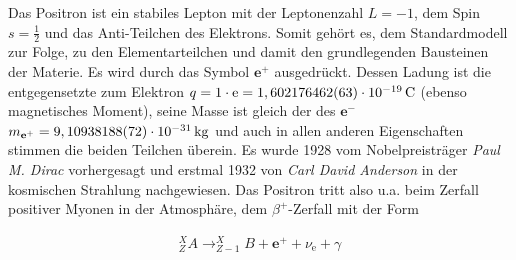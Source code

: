 \documentclass[numbers=noenddot,a4paper,notitlepage,twoside]{scrartcl}
\newcommand{\tenpo}[1]{ 10^{#1}}
\newcommand{\ix}[1]{_\text{#1}}
\newcommand{\tilt}[1]{\textit{#1}}
\begin{document}
			Das Positron ist ein stabiles Lepton mit der Leptonenzahl $L=-1$, dem Spin $s=\frac{1}{2}$ und das Anti-Teilchen des Elektrons. Somit gehört es, dem Standardmodell zur Folge, zu den Elementarteilchen und damit den grundlegenden Bausteinen der Materie. Es wird durch das Symbol $\textbf{e}^+$ ausgedrückt. Dessen Ladung ist die entgegensetzte zum Elektron $q=1\cdot\text{e}=\unit[1,602 176462(63)\cdot\tenpo{-19}]{C}$ (ebenso magnetisches Moment), seine Masse ist gleich der des $\textbf{e}^-$ $m_{\textbf{e}^+}=\unit[9,10938188(72)\cdot\tenpo{-31}]{kg}$ und auch in allen anderen Eigenschaften stimmen die beiden Teilchen überein. Es wurde 1928 vom Nobelpreisträger \tilt{Paul M. Dirac} vorhergesagt und erstmal 1932 von \tilt{Carl David Anderson} in der kosmischen Strahlung nachgewiesen. Das Positron tritt also u.a. beim Zerfall positiver Myonen in der Atmosphäre, dem $\beta^+$-Zerfall mit der Form
			
			\begin{align}
				^{X}_{Z}A \rightarrow ^{X}_{Z-1}B+\textbf{e}^{+}+\nu\ix{e}+\gamma
			\end{align}
	
\end{document}
